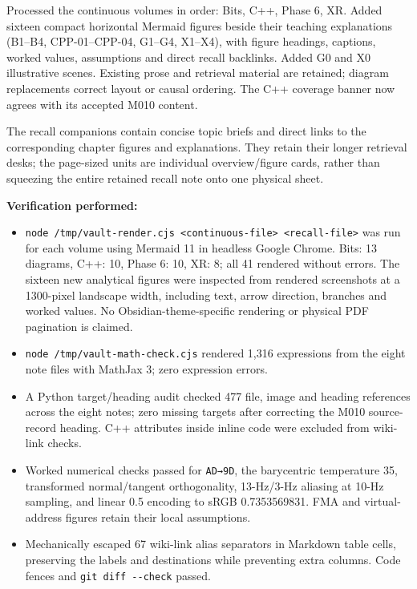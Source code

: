 Processed the continuous volumes in order: Bits, C++, Phase 6, XR. Added sixteen compact horizontal Mermaid figures beside their teaching explanations (B1--B4, CPP-01--CPP-04, G1--G4, X1--X4), with figure headings, captions, worked values, assumptions and direct recall backlinks. Added G0 and X0 illustrative scenes. Existing prose and retrieval material are retained; diagram replacements correct layout or causal ordering. The C++ coverage banner now agrees with its accepted M010 content.

The recall companions contain concise topic briefs and direct links to the corresponding chapter figures and explanations. They retain their longer retrieval desks; the page-sized units are individual overview/figure cards, rather than squeezing the entire retained recall note onto one physical sheet.

\textbf{Verification performed:}

\begin{itemize}
\tightlist
\item
  \texttt{node\ /tmp/vault-render.cjs\ \textless{}continuous-file\textgreater{}\ \textless{}recall-file\textgreater{}} was run for each volume using Mermaid 11 in headless Google Chrome. Bits: 13 diagrams, C++: 10, Phase 6: 10, XR: 8; all 41 rendered without errors. The sixteen new analytical figures were inspected from rendered screenshots at a 1300-pixel landscape width, including text, arrow direction, branches and worked values. No Obsidian-theme-specific rendering or physical PDF pagination is claimed.
\item
  \texttt{node\ /tmp/vault-math-check.cjs} rendered 1,316 expressions from the eight note files with MathJax 3; zero expression errors.
\item
  A Python target/heading audit checked 477 file, image and heading references across the eight notes; zero missing targets after correcting the M010 source-record heading. C++ attributes inside inline code were excluded from wiki-link checks.
\item
  Worked numerical checks passed for \texttt{AD→9D}, the barycentric temperature 35, transformed normal/tangent orthogonality, 13-Hz/3-Hz aliasing at 10-Hz sampling, and linear 0.5 encoding to sRGB 0.7353569831. FMA and virtual-address figures retain their local assumptions.
\item
  Mechanically escaped 67 wiki-link alias separators in Markdown table cells, preserving the labels and destinations while preventing extra columns. Code fences and \texttt{git\ diff\ -\/-check} passed.
\end{itemize}

